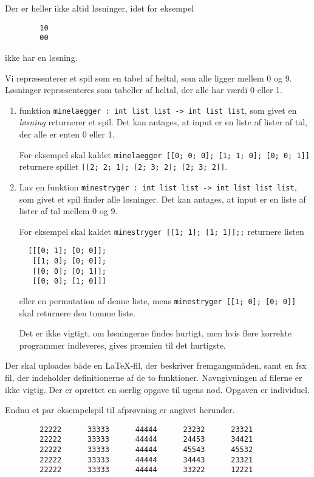 \documentclass[a4paper]{article}
\begin{document}
\noindent
Der er heller ikke altid løsninger, idet for eksempel

\begin{verbatim}
        10
        00
\end{verbatim}
 
\noindent
ikke har en løsning.

Vi repræsenterer et spil som en tabel af heltal, som alle ligger
mellem 0 og 9.  Løsninger repræsenteres som tabeller af heltal, der
alle har værdi 0 eller 1.

\begin{enumerate}[Nød {1}.1]

\item funktion \texttt{minelaegger : int list list -> int list list},
  som givet en \emph{løsning} returnerer et spil.  Det kan antages, at
  input er en liste af lister af tal, der alle er enten 0 eller 1.

For eksempel skal kaldet
\texttt{minelaegger [[0; 0; 0]; [1; 1; 0]; [0; 0; 1]]}
returnere spillet \texttt{[[2; 2; 1]; [2; 3; 2]; [2; 3; 2]]}.


\item Lav en funktion \texttt{minestryger : int list list -> int list list
  list}, som givet et spil finder alle løsninger.  Det kan antages, at input er en liste af lister af tal mellem 0 og 9.

For eksempel skal kaldet
\texttt{minestryger [[1; 1]; [1; 1]];;}
returnere listen

\begin{verbatim}
  [[[0; 1]; [0; 0]];
   [[1; 0]; [0; 0]];
   [[0; 0]; [0; 1]];
   [[0; 0]; [1; 0]]]
\end{verbatim}

\noindent
eller en permutation af denne liste, mens 
\texttt{minestryger [[1; 0]; [0; 0]]}
skal returnere den tomme liste.


Det er ikke vigtigt, om løsningerne findes hurtigt, men hvis flere
korrekte programmer indleveres, gives præmien til det hurtigste.

\end{enumerate}

\noindent
Der skal uploades både en \LaTeX-fil, der beskriver fremgangsmåden,
samt en fsx fil, der indeholder definitionerne af de to funktioner.
Navngivningen af filerne er ikke vigtig.  Der er oprettet en særlig
opgave til ugens nød.  Opgaven er individuel.

Endnu et par eksempelspil til afprøvning er angivet herunder.

\begin{verbatim}
        22222      33333      44444      23232      23321
        22222      33333      44444      24453      34421
        22222      33333      44444      45543      45532
        22222      33333      44444      34443      23321
        22222      33333      44444      33222      12221
\end{verbatim}
\end{document}
